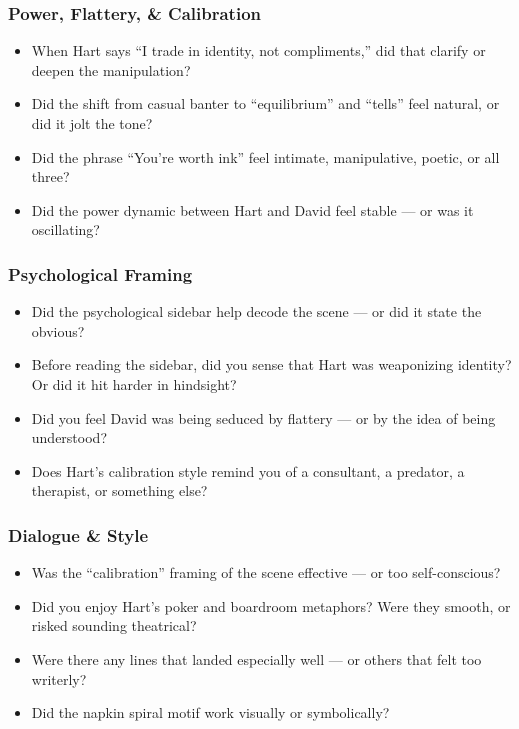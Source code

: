 \subsubsection{Power, Flattery, \& Calibration}

\begin{itemize}
    \item When Hart says “I trade in identity, not compliments,” did that clarify or deepen the manipulation?
    \item Did the shift from casual banter to “equilibrium” and “tells” feel natural, or did it jolt the tone?
    \item Did the phrase “You’re worth ink” feel intimate, manipulative, poetic, or all three?
    \item Did the power dynamic between Hart and David feel stable — or was it oscillating?
\end{itemize}

\subsubsection{Psychological Framing}

\begin{itemize}
    \item Did the psychological sidebar help decode the scene — or did it state the obvious?
    \item Before reading the sidebar, did you sense that Hart was weaponizing identity? Or did it hit harder in hindsight?
    \item Did you feel David was being seduced by flattery — or by the idea of being understood?
    \item Does Hart’s calibration style remind you of a consultant, a predator, a therapist, or something else?
\end{itemize}

\subsubsection{Dialogue \& Style}

\begin{itemize}
    \item Was the “calibration” framing of the scene effective — or too self-conscious?
    \item Did you enjoy Hart’s poker and boardroom metaphors? Were they smooth, or risked sounding theatrical?
    \item Were there any lines that landed especially well — or others that felt too writerly?
    \item Did the napkin spiral motif work visually or symbolically?
\end{itemize}

